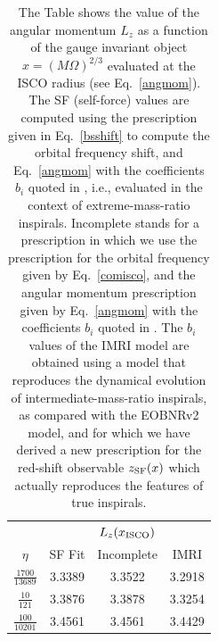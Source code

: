 \begin{table}%
\begin{center}
\begin{tabular}{|c|c|c|c|}
\hline\multicolumn{1}{|c|}{}&\multicolumn{3}{c|}{\(L_z(x_{\rm ISCO} )\)}\\\cline{2-4}
\multicolumn{1}{|c|}{\(\eta\)}&SF Fit&Incomplete&IMRI \\\cline{1-4}
$\frac{1700}{13689}$&3.3389 &3.3522&3.2918 \\[1ex]\cline{1-4}
$\frac{10}{121}$& 3.3876&3.3878&3.3254\\ [1ex]\cline{1-4}
$\frac{100}{10201}$& 3.4561&3.4561&3.4429\\[1ex]\hline
\end{tabular}
\caption{ The Table shows the value of the angular momentum \(L_z\) as a function of the gauge invariant object \(x=\left(M\Omega \right)^{2/3}\)  evaluated at the ISCO radius (see Eq.~\eqref{angmom}). The SF (self-force) values are computed using the prescription given in Eq.~\eqref{bsshift} to compute the orbital frequency shift, and Eq.~\eqref{angmom} with the coefficients \(b_i\) quoted in \cite{barus}, i.e., evaluated in the context of extreme-mass-ratio inspirals. Incomplete stands for a prescription in which we use the prescription for the orbital frequency given by Eq.~\eqref{comisco}, and the angular momentum prescription given by  Eq.~\eqref{angmom} with the coefficients \(b_i\) quoted in \cite{barus}. The   \(b_i\) values of the IMRI model are obtained using a model that reproduces the dynamical evolution of intermediate-mass-ratio inspirals, as compared with the EOBNRv2 model, and for which we have derived a new prescription for the red-shift observable \(z_{\rm SF} (x)\) which actually 
reproduces the features of true inspirals.}
\label{lzcomp}
\end{center}
\end{table}


